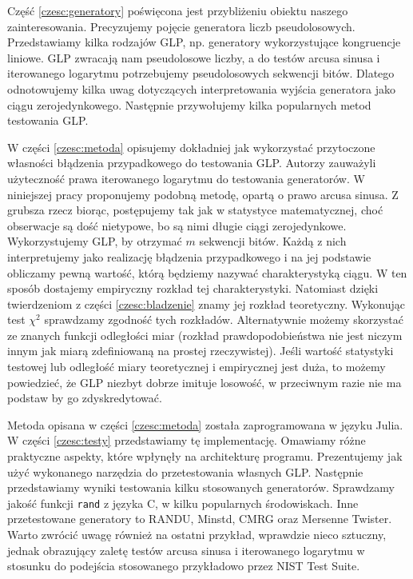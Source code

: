 \documentclass[a4paper,11pt,twoside]{book}
\theoremstyle{definition}
\begin{document}
Część \ref{czesc:generatory} poświęcona jest przybliżeniu obiektu naszego zainteresowania. Precyzujemy pojęcie generatora liczb pseudolosowych. Przedstawiamy kilka rodzajów GLP, np. generatory wykorzystujące kongruencje liniowe. GLP zwracają nam pseudolosowe liczby, a do testów arcusa sinusa i iterowanego logarytmu potrzebujemy pseudolosowych sekwencji bitów. Dlatego odnotowujemy kilka uwag dotyczących interpretowania wyjścia generatora jako ciągu zerojedynkowego. Następnie przywołujemy kilka popularnych metod testowania GLP.

W części \ref{czesc:metoda} opisujemy dokładniej jak wykorzystać przytoczone własności błądzenia przypadkowego do testowania GLP. Autorzy \cite{wang-nic} zauważyli użyteczność prawa iterowanego logarytmu do testowania generatorów. W niniejszej pracy proponujemy podobną metodę, opartą o prawo arcusa sinusa. Z grubsza rzecz biorąc, postępujemy tak jak w statystyce matematycznej, choć obserwacje są dość nietypowe, bo są nimi długie ciągi zerojedynkowe. Wykorzystujemy GLP, by otrzymać $m$ sekwencji bitów. Każdą z nich interpretujemy jako realizację błądzenia przypadkowego i na jej podstawie obliczamy pewną wartość, którą będziemy nazywać charakterystyką ciągu. W ten sposób dostajemy empiryczny rozkład tej charakterystyki. Natomiast dzięki twierdzeniom z części \ref{czesc:bladzenie} znamy jej rozkład teoretyczny. Wykonując test $\chi^2$ sprawdzamy zgodność tych rozkładów. Alternatywnie możemy skorzystać ze znanych funkcji odległości miar (rozkład prawdopodobieństwa nie jest niczym innym jak miarą zdefiniowaną na prostej rzeczywistej). Jeśli wartość statystyki testowej lub odległość miary teoretycznej i empirycznej jest duża, to możemy powiedzieć, że GLP niezbyt dobrze imituje losowość, w przeciwnym razie nie ma podstaw by go zdyskredytować.

Metoda opisana w części \ref{czesc:metoda} została zaprogramowana w języku Julia. W części \ref{czesc:testy} przedstawiamy tę implementację. Omawiamy różne praktyczne aspekty, które wpłynęły na architekturę programu. Prezentujemy jak użyć wykonanego narzędzia do przetestowania własnych GLP. Następnie przedstawiamy wyniki testowania kilku stosowanych generatorów. Sprawdzamy jakość funkcji \texttt{rand} z języka C, w kilku popularnych środowiskach. Inne przetestowane generatory to RANDU, Minstd, CMRG oraz Mersenne Twister. Warto zwrócić uwagę również na ostatni przykład, wprawdzie nieco sztuczny, jednak obrazujący zaletę testów arcusa sinusa i iterowanego logarytmu w stosunku do podejścia stosowanego przykładowo przez NIST Test Suite.
\end{document}

